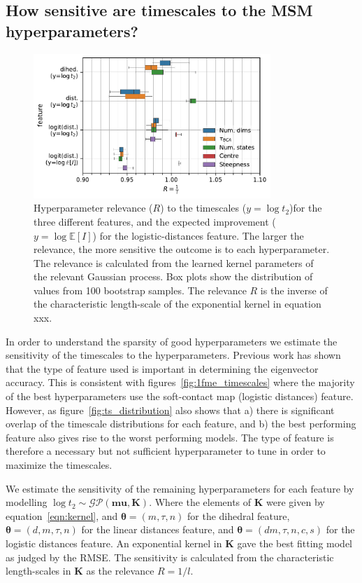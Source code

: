 \documentclass[journal=jacsat,manuscript=article]{achemso}
\begin{document}
\subsection{How sensitive are timescales to the MSM hyperparameters?}

\begin{figure}
    \centering
    \includegraphics[width=0.8\textwidth]{figures/sensitivity.pdf}
    \caption{Hyperparameter relevance ($R$) to the timescales ($y=\log{t_{2}}$)for the three different features,  and the expected improvement ($y=\log{\mathbb{E}[I]}$) for the logistic-distances feature. The larger the relevance, the more sensitive the outcome is to each hyperparameter.  The relevance is calculated from the learned kernel parameters of the relevant Gaussian process. Box plots show the distribution of values from \num{100} bootstrap samples. The relevance $R$ is the inverse of the characteristic length-scale of the exponential kernel in equation xxx. }
    \label{fig:sensitivity}
\end{figure}

In order to understand the sparsity of good hyperparameters we estimate the sensitivity of the timescales to the hyperparameters. Previous work has shown that the type of feature used is important in determining the eigenvector accuracy. This is consistent with figures~\ref{fig:1fme_timescales}  where the majority of the best hyperparameters use the soft-contact map (logistic distances) feature.  However, as figure~\ref{fig:ts_distribution} also shows that a) there is significant overlap of the timescale distributions for each feature, and b) the best performing feature also gives rise to the worst performing models. The type of feature is therefore a necessary but not sufficient hyperparameter to tune in order to maximize the timescales. 

We estimate the sensitivity of the remaining hyperparameters for each feature by modelling $\log{t_{2}} \sim \mathcal{GP}(\bm{mu}, \mathbf{K})$. Where the elements of $\mathbf{K}$ were given by equation~\ref{eqn:kernel}, and $\bm{\theta} = (m, \tau, n)$  for the dihedral feature,  $\bm{\theta} = (d, m, \tau, n)$ for the linear distances feature, and $\bm{\theta} = (d m, \tau, n, c, s)$  for the logistic distances feature. An exponential kernel in $\mathbf{K}$ gave the best fitting model as judged by the RMSE. The sensitivity is calculated from the characteristic length-scales in $\mathbf{K}$ as the relevance $R=1/l$.  
\end{document}
